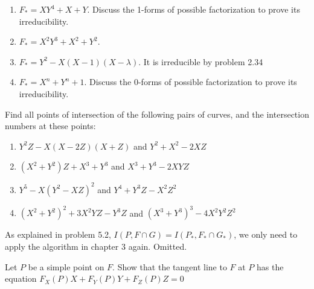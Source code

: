 \documentclass{solution}
\begin{document}
\begin{solution}
    \begin{enumerate}
        \item $F_* = XY^4 + X + Y$. Discuss the 1-forms of possible factorization to prove its irreducibility.
        \item $F_* = X^2Y^3 + X^2 + Y^2$. 
        \item $F_* = Y^2 - X(X - 1)(X - \lambda)$. It is irreducible by problem 2.34
        \item $F_* = X^n + Y^n + 1$. Discuss the 0-forms of possible factorization to prove its irreducibility.
    \end{enumerate}
\end{solution}

\begin{problem}{5.3}
    Find all points of intersection of the following pairs of curves, and the intersection numbers at these points:
    \begin{enumerate}
        \item $Y^2Z - X(X - 2Z)(X + Z)$ and $Y^2 + X^2 - 2XZ$
        \item $(X^2 + Y^2)Z + X^3 + Y^3$ and $X^3 + Y^3 - 2XYZ$
        \item $Y^5 - X(Y^2 - XZ)^2$ and $Y^4 + Y^3Z - X^2Z^2$
        \item $(X^2 + Y^2)^2 + 3X^2YZ - Y^3Z$ and $(X^3 + Y^3)^3 - 4X^2Y^2Z^2$
    \end{enumerate}
\end{problem}

\begin{solution}
    As explained in problem 5.2, $I(P, F \cap G) = I(P_*, F_* \cap G_*)$, we only need to apply the algorithm in chapter 3 again. Omitted.
\end{solution}

\begin{problem}{5.4}
    Let $P$ be a simple point on $F$. Show that the tangent line to $F$ at $P$ has the equation $F_X(P)X + F_Y(P)Y + F_Z(P)Z = 0$
\end{problem}
\end{document}
